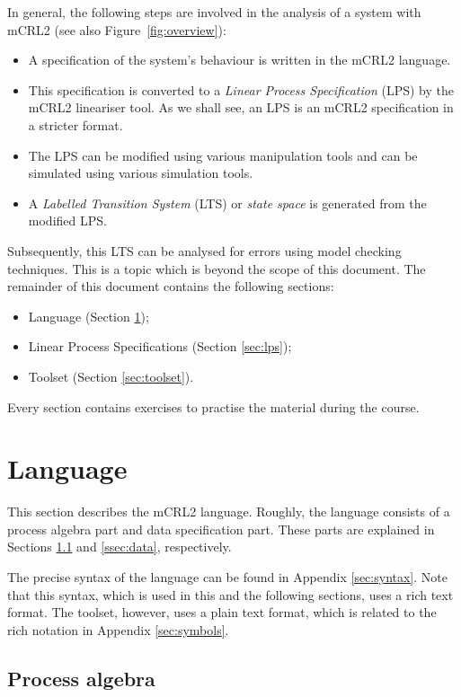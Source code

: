 \documentclass[a4paper,fleqn]{article}
\begin{document}
In general, the following steps are involved in the analysis of a system with
mCRL2 (see also Figure~\ref{fig:overview}):
\begin{itemize}
  \item A specification of the system's behaviour is written in the mCRL2
    language.
  \item This specification is converted to a \emph{Linear Process Specification}
    (LPS) by the mCRL2 lineariser tool. As we shall see, an LPS is an
    mCRL2 specification in a stricter format.
  \item The LPS can be modified using various manipulation tools and can be
    simulated using various simulation tools.
  \item A \emph{Labelled Transition System} (LTS) or \emph{state space} is
    generated from the modified LPS.
\end{itemize}

\noindent Subsequently, this LTS can be analysed for errors using model
checking techniques. This is a topic which is beyond the scope of this
document. The remainder of this document contains the following sections:
\begin{itemize}
  \item Language (Section \ref{sec:language});
  \item Linear Process Specifications (Section \ref{sec:lps});
  \item Toolset (Section \ref{sec:toolset}).
\end{itemize}

\noindent Every section contains exercises to practise the material during the
course. 

\section{Language}
\label{sec:language}

This section describes the mCRL2 language. Roughly, the language consists of
a process algebra part and data specification part. These parts are explained
in Sections \ref{ssec:process algebra} and \ref{ssec:data}, respectively.

The precise syntax of the language can be found in Appendix \ref{sec:syntax}.
Note that this syntax, which is used in this and the following sections, uses a
rich text format. The toolset, however, uses a plain text format, which is
related to the rich notation in Appendix \ref{sec:symbols}.

\subsection{Process algebra}
\label{ssec:process algebra}
\end{document}
